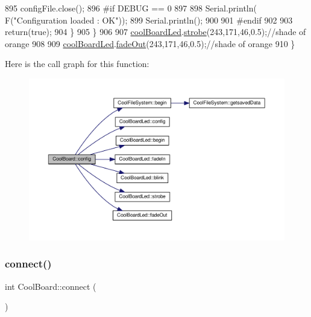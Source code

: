 \begin{DoxyCode}
895             configFile.close();
896 \textcolor{preprocessor}{            #if DEBUG == 0}
897 
898                 Serial.println( F(\textcolor{stringliteral}{"Configuration loaded : OK"}));
899                 Serial.println();
900 
901 \textcolor{preprocessor}{            #endif}
902 
903             \textcolor{keywordflow}{return}(\textcolor{keyword}{true});
904         \}
905     \}
906 
907     \hyperlink{class_cool_board_a1b1d3c684a5baa56b08486e192fd8e97}{coolBoardLed}.\hyperlink{class_cool_board_led_ad5f0de4c628cbfbf49896042831c64ad}{strobe}(243,171,46,0.5);\textcolor{comment}{//shade of orange}
908     
909     \hyperlink{class_cool_board_a1b1d3c684a5baa56b08486e192fd8e97}{coolBoardLed}.\hyperlink{class_cool_board_led_a93d545679237e8cc858324367149775c}{fadeOut}(243,171,46,0.5);\textcolor{comment}{//shade of orange               }
910 \}
\end{DoxyCode}
Here is the call graph for this function\+:\nopagebreak
\begin{figure}[H]
\begin{center}
\leavevmode
\includegraphics[width=350pt]{d7/df9/class_cool_board_a583a874c09c07e70a6eb9229fc4beddb_cgraph}
\end{center}
\end{figure}
\mbox{\label{class_cool_board_a519de78b807f8ec6463ff484eb925918}} 
\subsubsection{\texorpdfstring{connect()}{connect()}}
{\footnotesize\ttfamily int Cool\+Board\+::connect (\begin{DoxyParamCaption}{ }\end{DoxyParamCaption})}

